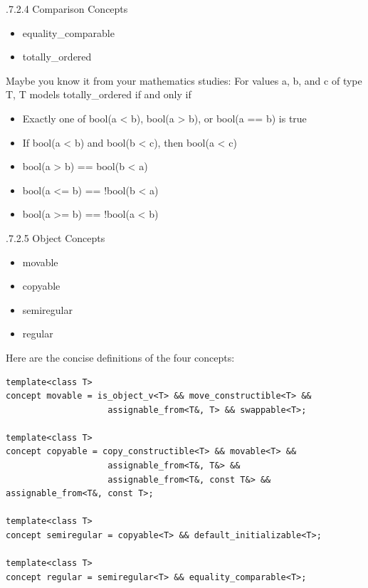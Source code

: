 .7.2.4\hspace{0.2cm} Comparison Concepts

\begin{itemize}
\item 
equality\_comparable

\item 
totally\_ordered
\end{itemize}

Maybe you know it from your mathematics studies: For values a, b, and c of type T, T models totally\_ordered if and only if

\begin{itemize}
\item 
Exactly one of bool(a < b), bool(a > b), or bool(a == b) is true

\item 
If bool(a < b) and bool(b < c), then bool(a < c)

\item 
bool(a > b) == bool(b < a)

\item 
bool(a <= b) == !bool(b < a)

\item 
bool(a >= b) == !bool(a < b)
\end{itemize}

.7.2.5\hspace{0.2cm} Object Concepts

\begin{itemize}
\item 
movable

\item 
copyable

\item 
semiregular

\item 
regular
\end{itemize}

Here are the concise definitions of the four concepts:

\begin{lstlisting}[style=styleCXX]
template<class T>
concept movable = is_object_v<T> && move_constructible<T> &&
					assignable_from<T&, T> && swappable<T>;

template<class T>
concept copyable = copy_constructible<T> && movable<T> &&
					assignable_from<T&, T&> &&
					assignable_from<T&, const T&> && assignable_from<T&, const T>;

template<class T>
concept semiregular = copyable<T> && default_initializable<T>;

template<class T>
concept regular = semiregular<T> && equality_comparable<T>;
\end{lstlisting}

